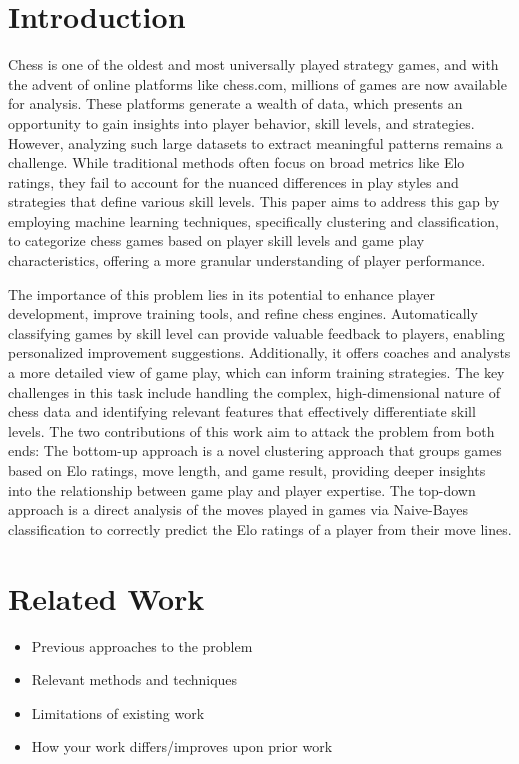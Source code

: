 \documentclass[conference]{IEEEtran}
\begin{document}
\section{Introduction}
Chess is one of the oldest and most universally played strategy games, and with the advent of online platforms like chess.com, millions of games are now available for analysis. These platforms generate a wealth of data, which presents an opportunity to gain insights into player behavior, skill levels, and strategies. However, analyzing such large datasets to extract meaningful patterns remains a challenge. While traditional methods often focus on broad metrics like Elo ratings, they fail to account for the nuanced differences in play styles and strategies that define various skill levels. This paper aims to address this gap by employing machine learning techniques, specifically clustering and classification, to categorize chess games based on player skill levels and game play characteristics, offering a more granular understanding of player performance.

The importance of this problem lies in its potential to enhance player development, improve training tools, and refine chess engines. Automatically classifying games by skill level can provide valuable feedback to players, enabling personalized improvement suggestions. Additionally, it offers coaches and analysts a more detailed view of game play, which can inform training strategies. The key challenges in this task include handling the complex, high-dimensional nature of chess data and identifying relevant features that effectively differentiate skill levels. The two contributions of this work aim to attack the problem from both ends: The bottom-up approach is a novel clustering approach that groups games based on Elo ratings, move length, and game result, providing deeper insights into the relationship between game play and player expertise. The top-down approach is a direct analysis of the moves played in games via Naive-Bayes classification to correctly predict the Elo ratings of a player from their move lines.

\section{Related Work}
\begin{itemize}
\item Previous approaches to the problem
\item Relevant methods and techniques
\item Limitations of existing work
\item How your work differs/improves upon prior work
\end{itemize}
\end{document}

